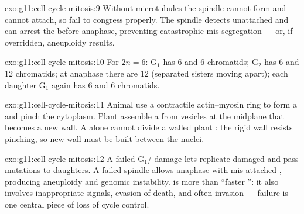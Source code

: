 \begin{solution}{exo:g11:cell-cycle-mitosis:9}
Without microtubules the spindle cannot form and  cannot attach,
so  fail to congress properly. The spindle  detects
unattached  and can arrest the  before anaphase, preventing
catastrophic mis-segregation --- or, if overridden, aneuploidy results.
\end{solution}

\begin{solution}{exo:g11:cell-cycle-mitosis:10}
For $2n = 6$: G$_1$ has $6$  and $6$ chromatids; G$_2$ has $6$
 and $12$ chromatids; at anaphase there are $12$ 
(separated sisters moving apart); each daughter G$_1$ again has $6$
 and $6$ chromatids.
\end{solution}

\begin{solution}{exo:g11:cell-cycle-mitosis:11}
Animal  use a contractile actin--myosin ring to form a 
and pinch the cytoplasm. Plant  assemble a  from vesicles at
the midplane that becomes a new wall. A  alone cannot divide a
walled plant : the rigid wall resists pinching, so new wall must be built
between the nuclei.
\end{solution}

\begin{solution}{exo:g11:cell-cycle-mitosis:12}
A failed G$_1$/ damage  lets  replicate damaged  and pass
mutations to daughters. A failed spindle  allows anaphase with
mis-attached , producing aneuploidy and genomic instability. 
is more than ``faster '': it also involves inappropriate  signals,
evasion of death, and often invasion ---  failure is one central
piece of loss of cycle control.
\end{solution}

